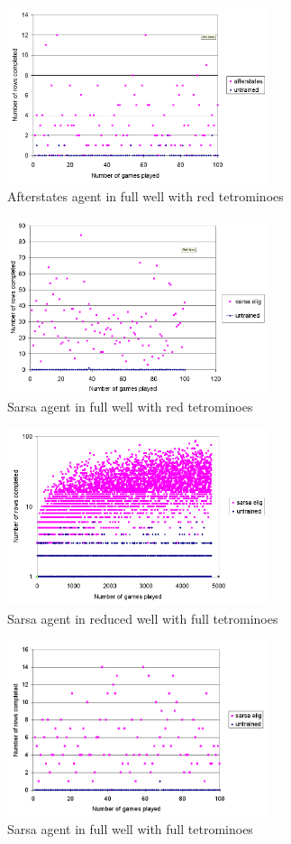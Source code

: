 \documentclass{rucsthesis}
\begin{document}
\begin{figure}[h]
\centering
\includegraphics[width=3in]{afterstatesredtetfullwell.png}
\caption{Afterstates agent in full well with red tetrominoes}
\label{fig:comparemelax}
\end{figure}

\begin{figure}[h]
\centering
\includegraphics[width=3in]{sarsaeligredtetfullwell.png}
\caption{Sarsa agent in full well with red tetrominoes}
\label{fig:comparemelax}
\end{figure}

\begin{figure}[h]
\centering
\includegraphics[width=3in]{sarsaeligfulltetredwell.png}
\caption{Sarsa agent in reduced well with full tetrominoes}
\label{fig:comparemelax}
\end{figure}

\begin{figure}[h]
\centering
\includegraphics[width=3in]{sarsaeligfulltetfullwell.png}
\caption{Sarsa agent in full well with full tetrominoes}
\label{fig:comparemelax}
\end{figure}
\end{document}
